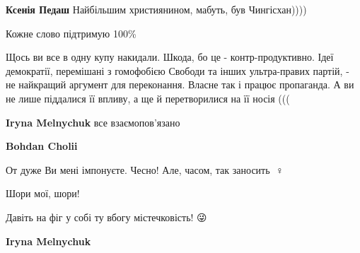 \begin{itemize}
\begin{itemize}
\textbf{Ксенія Педаш} Найбільшим християнином, мабуть, був Чингісхан))))
\end{itemize}

 
Кожне слово підтримую 100\%

 

Щось ви все в одну купу накидали. Шкода, бо це - контр-продуктивно. Ідеї
демократії, перемішані з гомофобією Свободи та інших ультра-правих партій, - не
найкращий аргумент для переконання. Власне так і працює пропаганда. А ви не
лише піддалися її впливу, а ще й перетворилися на її носія (((

\begin{itemize}
 
\textbf{Iryna Melnychuk} все взаємопов'язано

 
\textbf{Bohdan Cholii}

От дуже Ви мені імпонуєте. Чесно! Але, часом, так заносить 🤦♀️

Шори мої, шори!

Давіть на фіг у собі ту вбогу містечковість! 😜


 
\textbf{Iryna Melnychuk} 


\end{itemize}
\end{itemize}
